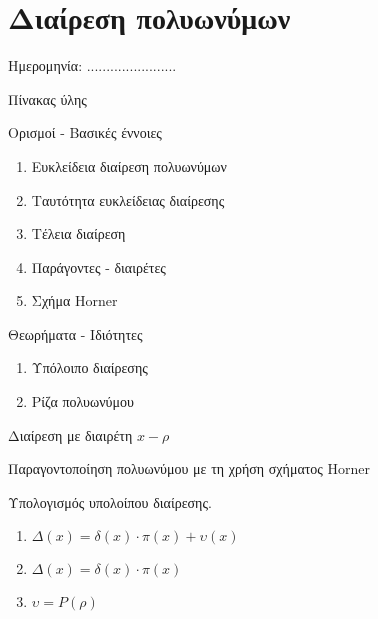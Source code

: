 \documentclass[twoside,nofonts,internet,math,spyros]{frontisthrio}
\newcommand{\myitem}{\stepcounter{enumi}\item[\raisebox{0.5mm}{\faExclamationTriangle}\ \Large$\square$]}
\begin{document}
\newpage
\section{Διαίρεση πολυωνύμων}
\begin{flushright}
\faCalendar* Ημερομηνία: .......................
\end{flushright}
\begin{mybox}[mysubtitle]{Πίνακας ύλης}
\begin{tcbraster}[raster columns=2,raster equal height]
\begin{myleftbox}{Ορισμοί - Βασικές έννοιες\ \ \faBook}
\begin{enumerate}[itemsep=0mm]
\item Ευκλείδεια διαίρεση πολυωνύμων
\item Ταυτότητα ευκλείδειας διαίρεσης
\item Τέλεια διαίρεση
\item Παράγοντες - διαιρέτες
\item Σχήμα Horner
\end{enumerate}
\end{myleftbox}
\begin{myrightbox}{Θεωρήματα - Ιδιότητες\ \ \faTools}
\begin{enumerate}[itemsep=0mm]
\item Υπόλοιπο διαίρεσης
\item Ρίζα πολυωνύμου
\end{enumerate}
\end{myrightbox}
\end{tcbraster}
\begin{multicols}{2}
\begin{todolist}[itemsep=0mm]
\myitem Διαίρεση με διαιρέτη $x-\rho$
\item Παραγοντοποίηση πολυωνύμου με τη χρήση σχήματος Horner
\item Υπολογισμός υπολοίπου διαίρεσης.
\item 
\end{todolist}
\end{multicols}
\begin{multicols}{2}
\begin{enumerate}[itemsep=0mm,leftmargin=3mm]
\item $ \varDelta(x)=\delta(x)\cdot\pi(x)+\upsilon(x) $
\item $ \varDelta(x)=\delta(x)\cdot\pi(x) $
\item $\upsilon=P(\rho)$
\end{enumerate}
\end{multicols}
\end{mybox}
\end{document}
